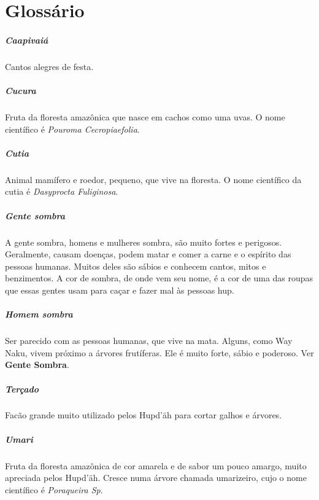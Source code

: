 \blankpage
\chapter{Glossário}


\paragraph{Caapivaiá} Cantos alegres de festa.

\paragraph{Cucura} Fruta da floresta amazônica que nasce em cachos
como uma uvas. O nome científico é \textit{Pouroma Cecropiaefolia}.

\paragraph{Cutia} Animal mamífero e roedor, pequeno, que vive na floresta. O nome
científico da cutia é \textit{Dasyprocta Fuliginosa}.

\paragraph{Gente sombra} A gente­ sombra, homens e mulheres­ sombra, são
muito fortes e perigosos. Geralmente, causam doenças, podem matar
e comer a carne e o espírito das pessoas humanas. Muitos deles
são sábios e conhecem cantos, mitos e benzimentos. A cor de
sombra, de onde vem seu nome, é a cor de uma das roupas que essas gentes
usam para caçar e fazer mal às pessoas hup.

\paragraph{Homem sombra} Ser parecido com as pessoas
humanas, que vive na mata. Alguns, como Way Naku, vivem próximo a árvores frutíferas. Ele
é muito forte, sábio e poderoso. Ver \textbf{Gente­ Sombra}.

\paragraph{Terçado} Facão grande muito utilizado pelos Hupd’äh para cortar
galhos e árvores.

\paragraph{Umari} Fruta da floresta amazônica de cor
amarela e de sabor um pouco amargo, muito apreciada pelos Hupd’äh.
Cresce numa árvore chamada umarizeiro, cujo o nome científico é \textit{Poraqueira Sp}.
